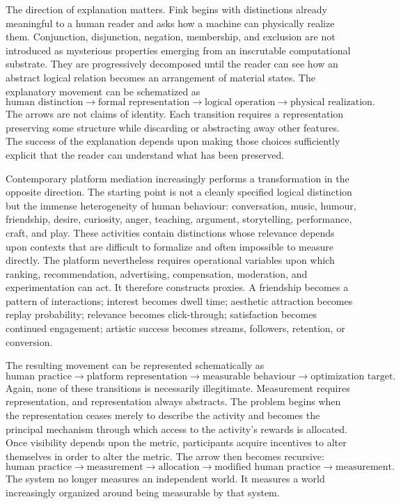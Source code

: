 \documentclass[11pt]{article}
\begin{document}
The direction of explanation matters. Fink begins with distinctions already meaningful to a human reader and asks how a machine can physically realize them. Conjunction, disjunction, negation, membership, and exclusion are not introduced as mysterious properties emerging from an inscrutable computational substrate. They are progressively decomposed until the reader can see how an abstract logical relation becomes an arrangement of material states. The explanatory movement can be schematized as
\[
\text{human distinction}
\longrightarrow
\text{formal representation}
\longrightarrow
\text{logical operation}
\longrightarrow
\text{physical realization}.
\]
The arrows are not claims of identity. Each transition requires a representation preserving some structure while discarding or abstracting away other features. The success of the explanation depends upon making those choices sufficiently explicit that the reader can understand what has been preserved.

Contemporary platform mediation increasingly performs a transformation in the opposite direction. The starting point is not a cleanly specified logical distinction but the immense heterogeneity of human behaviour: conversation, music, humour, friendship, desire, curiosity, anger, teaching, argument, storytelling, performance, craft, and play. These activities contain distinctions whose relevance depends upon contexts that are difficult to formalize and often impossible to measure directly. The platform nevertheless requires operational variables upon which ranking, recommendation, advertising, compensation, moderation, and experimentation can act. It therefore constructs proxies. A friendship becomes a pattern of interactions; interest becomes dwell time; aesthetic attraction becomes replay probability; relevance becomes click-through; satisfaction becomes continued engagement; artistic success becomes streams, followers, retention, or conversion.

The resulting movement can be represented schematically as
\[
\text{human practice}
\longrightarrow
\text{platform representation}
\longrightarrow
\text{measurable behaviour}
\longrightarrow
\text{optimization target}.
\]
Again, none of these transitions is necessarily illegitimate. Measurement requires representation, and representation always abstracts. The problem begins when the representation ceases merely to describe the activity and becomes the principal mechanism through which access to the activity's rewards is allocated. Once visibility depends upon the metric, participants acquire incentives to alter themselves in order to alter the metric. The arrow then becomes recursive:
\[
\text{human practice}
\longrightarrow
\text{measurement}
\longrightarrow
\text{allocation}
\longrightarrow
\text{modified human practice}
\longrightarrow
\text{measurement}.
\]
The system no longer measures an independent world. It measures a world increasingly organized around being measurable by that system.
\end{document}
